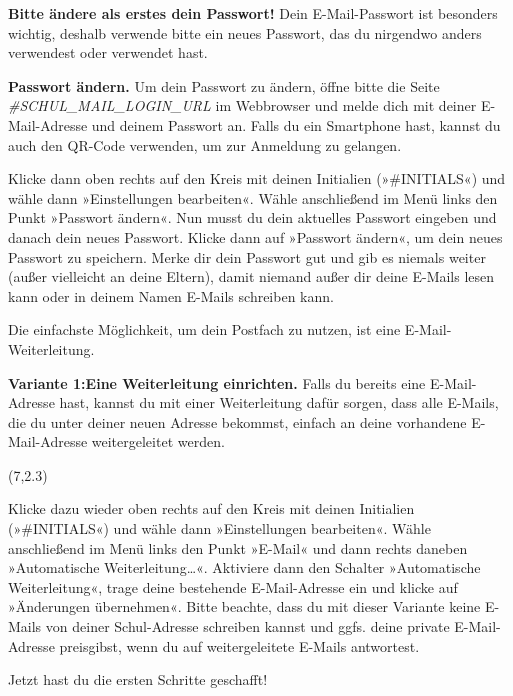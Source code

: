 {\bf Bitte ändere als erstes dein Passwort! } Dein E-Mail-Passwort ist besonders wichtig, deshalb verwende bitte ein neues Passwort, das du nirgendwo anders verwendest oder verwendet hast. 

{\bf Passwort ändern.} Um dein Passwort zu ändern, öffne bitte die Seite {\em #{SCHUL_MAIL_LOGIN_URL}} im Webbrowser und melde dich mit deiner E-Mail-Adresse und deinem Passwort an. Falls du ein Smartphone hast, kannst du auch den QR-Code verwenden, um zur Anmeldung zu gelangen.

Klicke dann oben rechts auf den Kreis mit deinen Initialien (»#{INITIALS}«) und wähle dann »Einstellungen bearbeiten«. Wähle anschließend im Menü links den Punkt »Passwort ändern«. Nun musst du dein aktuelles Passwort eingeben und danach dein neues Passwort. Klicke dann auf »Passwort ändern«, um dein neues Passwort zu speichern. Merke dir dein Passwort gut und gib es niemals weiter (außer vielleicht an deine Eltern), damit niemand außer dir deine E-Mails lesen kann oder in deinem Namen E-Mails schreiben kann.

Die einfachste Möglichkeit, um dein Postfach zu nutzen, ist eine E-Mail-Weiterleitung. 

{\bf Variante 1:\hspace*{3mm}Eine Weiterleitung einrichten.} Falls du bereits eine E-Mail-Adresse hast, kannst du mit einer Weiterleitung dafür sorgen, dass alle E-Mails, die du unter deiner neuen Adresse bekommst, einfach an deine vorhandene E-Mail-Adresse weitergeleitet werden.

\begin{textblock}{4}(7,2.3)
\scalebox{0.2}{}
\end{textblock}

Klicke dazu wieder oben rechts auf den Kreis mit deinen Initialien (»#{INITIALS}«) und wähle dann »Einstellungen bearbeiten«. Wähle anschließend im Menü links den Punkt »E-Mail« und dann rechts daneben »Automatische Weiterleitung…«. Aktiviere dann den Schalter »Automatische Weiterleitung«, trage deine bestehende E-Mail-Adresse ein und klicke auf »Änderungen übernehmen«. Bitte beachte, dass du mit dieser Variante keine E-Mails von deiner Schul-Adresse schreiben kannst und ggfs. deine private E-Mail-Adresse preisgibst, wenn du auf weitergeleitete E-Mails antwortest.

Jetzt hast du die ersten Schritte geschafft!

\clearpage
\rfoot{}

\vspace*{0.1mm}

